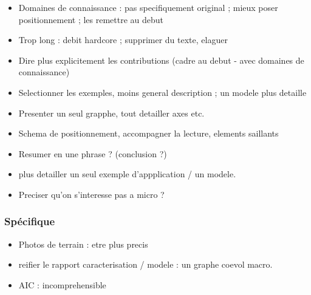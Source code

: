 \documentclass[11pt]{article}
\begin{document}
\begin{itemize}
	\item Domaines de connaissance : pas specifiquement original ; mieux poser positionnement ; les remettre au debut
	\item Trop long : debit hardcore ; supprimer du texte, elaguer
	\item Dire plus explicitement les contributions (cadre au debut - avec domaines de connaissance)
	\item Selectionner les exemples, moins general description ; un modele plus detaille
	\item Presenter un seul grapphe, tout detailler axes etc.
	\item Schema de positionnement, accompagner la lecture, elements saillants
	\item Resumer en une phrase ? (conclusion ?)
	\item plus detailler un seul exemple d'appplication / un modele.
	\item Preciser qu'on s'interesse pas a micro ?
\end{itemize}



\subsubsection*{Spécifique}

\begin{itemize}
	\item Photos de terrain : etre plus precis
	\item reifier le rapport caracterisation / modele : un graphe coevol macro.
	\item AIC : incomprehensible
\end{itemize}









%
\end{document}
